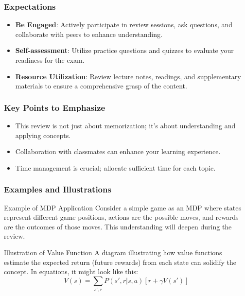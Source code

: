\documentclass{beamer}
\begin{document}
\begin{frame}[fragile]
    \frametitle{Expectations}
    \begin{itemize}
        \item \textbf{Be Engaged}: Actively participate in review sessions, ask questions, and collaborate with peers to enhance understanding.
        \item \textbf{Self-assessment}: Utilize practice questions and quizzes to evaluate your readiness for the exam.
        \item \textbf{Resource Utilization}: Review lecture notes, readings, and supplementary materials to ensure a comprehensive grasp of the content.
    \end{itemize}
\end{frame}

\begin{frame}[fragile]
    \frametitle{Key Points to Emphasize}
    \begin{itemize}
        \item This review is not just about memorization; it's about understanding and applying concepts.
        \item Collaboration with classmates can enhance your learning experience.
        \item Time management is crucial; allocate sufficient time for each topic.
    \end{itemize}
\end{frame}

\begin{frame}[fragile]
    \frametitle{Examples and Illustrations}
    \begin{block}{Example of MDP Application}
        Consider a simple game as an MDP where states represent different game positions, actions are the possible moves, and rewards are the outcomes of those moves. This understanding will deepen during the review.
    \end{block}
    
    \begin{block}{Illustration of Value Function}
        A diagram illustrating how value functions estimate the expected return (future rewards) from each state can solidify the concept. In equations, it might look like this:
        \begin{equation}
            V(s) = \sum_{s', r} P(s', r | s, a) [r + \gamma V(s')]
        \end{equation}
    \end{block}
\end{frame}
\end{document}
